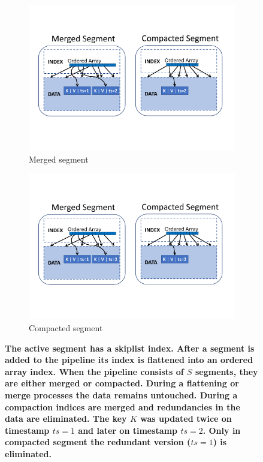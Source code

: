 \begin{figure}[tb]
\begin{subfigure}[t]{0.5\columnwidth}
      \includegraphics[width=\figw]{merged-seg.pdf}
      \caption[]{Merged segment}
    \label{fig:flattening:merge}
  \end{subfigure}
  \begin{subfigure}[t]{0.5\columnwidth}
      \includegraphics[width=\figw]{compacted-seg.pdf}
      \caption[]{Compacted segment}
    \label{fig:flattening:compaction}
  \end{subfigure}

\caption{\textbf{The active segment has a skiplist index. After a segment is added to the pipeline its index is flattened into an ordered array index. When the pipeline consists of $S$ segments, they are either merged or compacted. During a flattening or merge processes the data remains untouched. During a compaction indices are merged and redundancies in the data are eliminated. The key $K$ was updated twice on timestamp $ts=1$ and later on timestamp $ts=2$. Only in compacted segment the redundant version ($ts=1$) is eliminated.} }
\label{fig:flattening}
\end{figure}

